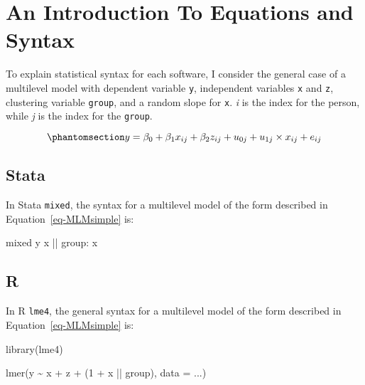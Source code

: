 \documentclass[
  letterpaper,
  DIV=11,
  numbers=noendperiod]{scrreprt}
\newenvironment{Shaded}{\begin{snugshade}}{\end{snugshade}}
\newcommand{\AttributeTok}[1]{\textcolor[rgb]{0.40,0.45,0.13}{#1}}
\newcommand{\DecValTok}[1]{\textcolor[rgb]{0.68,0.00,0.00}{#1}}
\newcommand{\FunctionTok}[1]{\textcolor[rgb]{0.28,0.35,0.67}{#1}}
\newcommand{\NormalTok}[1]{\textcolor[rgb]{0.00,0.23,0.31}{#1}}
\newcommand{\SpecialCharTok}[1]{\textcolor[rgb]{0.37,0.37,0.37}{#1}}
\begin{document}
\section{An Introduction To Equations and Syntax}\label{sec-syntax}

To explain statistical syntax for each software, I consider the general
case of a multilevel model with dependent variable \texttt{y},
independent variables \texttt{x} and \texttt{z}, clustering variable
\texttt{group}, and a random slope for \texttt{x}. \emph{i} is the index
for the person, while \emph{j} is the index for the \texttt{group}.

\begin{equation}\phantomsection\label{eq-MLMsimple}{y = \beta_0 + \beta_1 x_{ij} + \beta_2 z_{ij} + u_{0j} + u_{1j} \times x_{ij} + e_{ij}}\end{equation}

\subsection{Stata}

In Stata \texttt{mixed}, the syntax for a multilevel model of the form
described in Equation~\ref{eq-MLMsimple} is:

\begin{Shaded}
\begin{Highlighting}[]
\NormalTok{mixed }\FunctionTok{y}\NormalTok{ x || }\FunctionTok{group}\NormalTok{: x}
\end{Highlighting}
\end{Shaded}

\subsection{R}

In R \texttt{lme4}, the general syntax for a multilevel model of the
form described in Equation~\ref{eq-MLMsimple} is:

\begin{Shaded}
\begin{Highlighting}[]
\FunctionTok{library}\NormalTok{(lme4)}

\FunctionTok{lmer}\NormalTok{(y }\SpecialCharTok{\textasciitilde{}}\NormalTok{ x }\SpecialCharTok{+}\NormalTok{ z }\SpecialCharTok{+}\NormalTok{ (}\DecValTok{1} \SpecialCharTok{+}\NormalTok{ x }\SpecialCharTok{||}\NormalTok{ group), }\AttributeTok{data =}\NormalTok{ ...)}
\end{Highlighting}
\end{Shaded}
\end{document}
